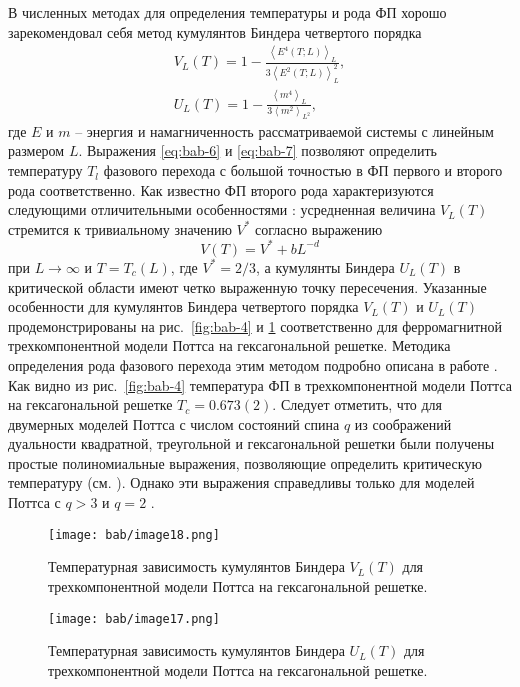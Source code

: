В численных методах для определения температуры и рода ФП хорошо зарекомендовал себя метод кумулянтов Биндера четвертого порядка \cite{bib:bab-12}
\begin{gather}
    \label{eq:bab-6}
    V_L(T) = 1 - \frac{\left<E^4(T; L)\right>_L}{3\left<E^2(T; L)\right>_L^2}, \\
    \label{eq:bab-7}
    U_L(T) = 1 - \frac{\left<m^4\right>_L}{3\left<m^2\right>_{L^2}},
\end{gather}
где $E$ и $m$ -- энергия и намагниченность рассматриваемой системы с линейным размером $L$. Выражения \eqref{eq:bab-6} и \eqref{eq:bab-7} позволяют определить температуру $T_l$ фазового перехода с большой точностью в ФП первого и второго рода соответственно. Как известно ФП второго рода характеризуются следующими отличительными особенностями \cite{bib:bab-13}: усредненная величина $V_L(T)$ стремится к тривиальному значению $V^*$ согласно выражению
\begin{equation*}
    V(T) = V^* + bL^{-d}
\end{equation*}
при $L \to \infty$ и $T=T_c(L)$, где $V^* = 2/3$, а кумулянты Биндера $U_L(T)$ в критической области имеют четко выраженную точку пересечения. Указанные особенности для кумулянтов Биндера четвертого порядка $V_L(T)$ и $U_L(T)$ продемонстрированы на рис.~\ref{fig:bab-4} и \ref{fig:bab-5} соответственно для ферромагнитной трехкомпонентной модели Поттса на гексагональной решетке. Методика определения рода фазового перехода этим методом подробно описана в работе \cite{bib:bab-14}. Как видно из рис.~\ref{fig:bab-4} температура ФП в трехкомпонентной модели Поттса на гексагональной решетке $T_c=0.673(2)$. Следует отметить, что для двумерных моделей Поттса с числом состояний спина $q$ из соображений дуальности квадратной, треугольной и гексагональной решетки были получены простые полиномиальные выражения, позволяющие определить критическую температуру (см. \cite{bib:bab-8}). Однако эти выражения справедливы только для моделей Поттса с $q>3$ и $q=2$ \cite{bib:bab-9}.
\begin{figure}[ht]
    \begin{minipage}[c]{0.45\linewidth}
        \texttt{[image: bab/image18.png]}
        \caption{Температурная зависимость кумулянтов Биндера $V_L(T)$ для трехкомпонентной модели Поттса на гексагональной решетке.}
        \label{fig:bab-4}
    \end{minipage}
    \hfill
    \begin{minipage}[c]{0.45\linewidth}
        \texttt{[image: bab/image17.png]}
        \caption{Температурная зависимость кумулянтов Биндера $U_L(T)$ для трехкомпонентной модели Поттса на гексагональной решетке.}
        \label{fig:bab-5}
    \end{minipage}
\end{figure}

